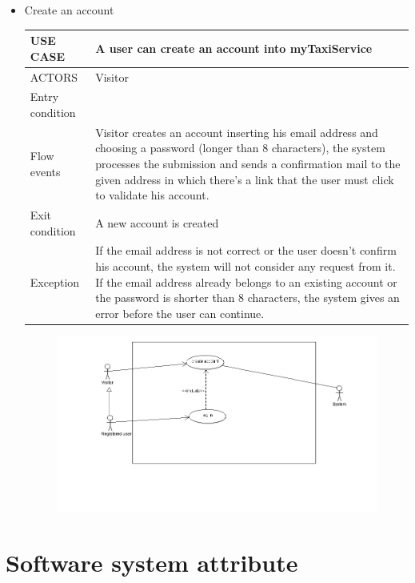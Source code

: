 \begin{itemize}
\item Create an account
\begin{center}
    \begin{tabular}{ | l | p{11cm} |}
    \hline
   USE CASE & A user can create an account into myTaxiService \\ \hline
    ACTORS & Visitor \\ \hline
     Entry condition &  \\ \hline
     Flow events & Visitor creates an account inserting his email address and choosing a password (longer than 8 characters), the system processes the submission and sends a confirmation mail to the given address in which there’s a link that the user must click to validate his account. \\ \hline
     Exit condition & A new account is created \\ \hline
     Exception &  If the email address is not correct or the user doesn’t confirm his account, the system will not consider any request from it. If the email address already belongs to an existing account or the password is shorter than 8 characters, the system gives an error before the user can continue.\\ \hline
    \end{tabular}
\end{center}
\begin{center}
\begin{figure} [h]
    \includegraphics [width=\textwidth]{register.png}
\end{figure}
\end{center}
\end{itemize}






\section{Software system attribute}
